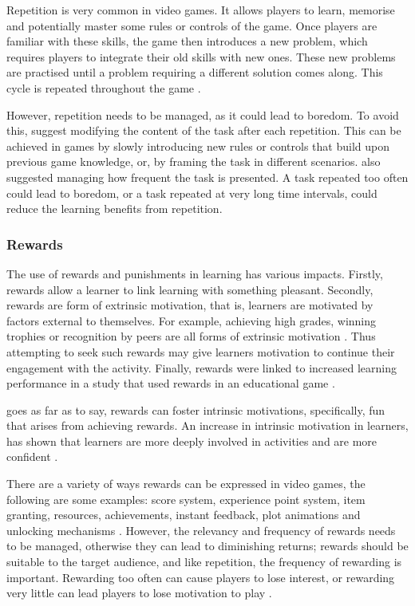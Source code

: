 \documentclass[a4paper,11.5pt]{report}
\numberwithin{figure}{section}
\numberwithin{table}{section}
\numberwithin{equation}{section}
\numberwithin{equation}{section}
\begin{document}
Repetition is very common in video games. It allows players to learn, memorise and potentially master some rules or controls of the game. Once players are familiar with these skills, the game then introduces a new problem, which requires players to integrate their old skills with new ones. These new problems are practised until a  problem requiring a different solution comes along. This cycle is repeated throughout the game \citep{Gee2003}.

However, repetition needs to be managed, as it could lead to boredom. To avoid this, \citet{roungas2015} suggest modifying the content of the task after each repetition. This can be achieved in games by slowly introducing new rules or controls that build upon previous game knowledge, or, by framing the task in different scenarios. \citet{roungas2015} also suggested managing how frequent the task is presented. A task repeated too often could lead to boredom, or a task repeated at very long time intervals, could reduce the learning benefits from repetition.


\subsubsection{Rewards}

The use of rewards and punishments in learning has various impacts. Firstly, rewards allow a learner to link learning with something pleasant. Secondly, rewards are form of extrinsic motivation, that is, learners are motivated by factors external to themselves. For example, achieving high grades, winning trophies or recognition by peers are all forms of extrinsic motivation \citep{roungas2015}. Thus attempting to seek such rewards may give learners motivation to continue their engagement with the activity. Finally, rewards were linked to increased learning performance in a study that used rewards in an educational game \citep{Filsecker2014}.

\citet{wang2011} goes as far as to say, rewards can foster intrinsic motivations, specifically, fun that arises from achieving rewards. An increase in intrinsic motivation in learners, has shown that learners are more deeply involved in activities and are more confident \citep{Cordova1996}. 

There are a variety of ways rewards can be expressed in video games, the following are some examples: score system, experience point system, item granting, resources, achievements, instant feedback, plot animations and unlocking mechanisms \citep{wang2011}. However, the relevancy and frequency of rewards needs to be managed, otherwise they can lead to diminishing returns; rewards should be suitable to the target audience, and like repetition, the frequency of rewarding is important. Rewarding too often can cause players to lose interest, or rewarding very little can lead players to lose motivation to play \citep{roungas2015}.
\end{document}

